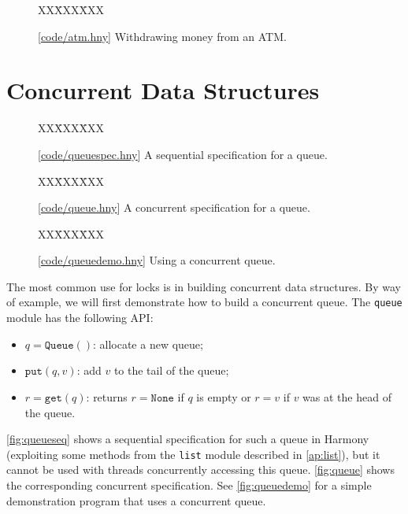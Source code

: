 \documentclass{report}
\newcommand{\harmonysource}[1]{
\begin{tabbing}
XX\=XXX\=XXX\kill
    
\end{tabbing}
}
\newcommand{\harmonylink}[1]{%
[\href{https://harmony.cs.cornell.edu/#1}{\underline{#1}}]%
}
\newenvironment{code}{
\tcolorbox
}{
\endtcolorbox
}
\begin{document}
\begin{figure}
\begin{code}
\harmonysource{atm}
\end{code}
\caption{\harmonylink{code/atm.hny} Withdrawing money from an ATM.}
\label{fig:atm}
\end{figure}

\chapter{Concurrent Data Structures}
\label{ch:cds}

\begin{figure}
\begin{code}
\harmonysource{queuespec}
\end{code}
\caption{\harmonylink{code/queuespec.hny} A sequential specification for a queue.}
\label{fig:queueseq}
\end{figure}

\begin{figure}
\begin{code}
\harmonysource{queue}
\end{code}
\caption{\harmonylink{code/queue.hny} A concurrent specification for a queue.}
\label{fig:queue}
\end{figure}

\begin{figure}
\begin{code}
\harmonysource{queuedemo}
\end{code}
\caption{\harmonylink{code/queuedemo.hny} Using a concurrent queue.}
\label{fig:queuedemo}
\end{figure}

The most common use for locks is in building concurrent data structures.
By way of example, we will first demonstrate how to build a concurrent queue.
The \texttt{queue} module has the following API:
\begin{itemize}
\item $q = \mathtt{Queue}()$: allocate a new queue;
\item $\mathtt{put}(q, v)$: add $v$ to the tail of the queue;
\item $r = \mathtt{get}(q)$: returns $r = \mathtt{None}$
if $q$ is empty or $r = v$ if $v$ was at the head of the queue.
\end{itemize}

\noindent
\autoref{fig:queueseq} shows a sequential specification for such a
queue in Harmony (exploiting some methods from the \texttt{list}
module described in \autoref{ap:list}),
but it cannot be used with threads concurrently accessing this queue.
\autoref{fig:queue} shows the corresponding concurrent specification.
See \autoref{fig:queuedemo} for a simple demonstration program that uses
a concurrent queue.
\end{document}
